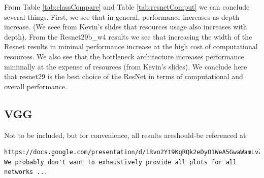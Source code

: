 \documentclass[11pt,a4paper]{article}
\begin{document}
\par From Table \ref{tab:classCompare} and Table \ref{tab:resnetComput} we can conclude several things.  First, we see that in general, performance increases as depth increase.  (We seee from Kevin's slides that resources usage also increases with depth). From the Resnet29b\_w4 results we see that increasing the width of the Resnet results in minimal performance increase at the high cost of computational resources.  We also see that the bottleneck architecture increases performance minimally at the expense of resources (from Kevin's slides).  We conclude here that resnet29 is the best choice of the ResNet in terms of computational and overall performance.  

\subsection{VGG}


{\color{red} Not to be included, but for convenience, all results are\/should-be referenced at 
\begin{verbatim}https://docs.google.com/presentation/d/1Rvo2Yt9KqRQk2eDyO1WeA5GwaWamLvZR2CR3txfYbBE/edit#slide=id.g1ec338afdf_0_11. We probably don't want to exhaustively provide all plots for all networks ...
\end{verbatim}
}

\end{document}
